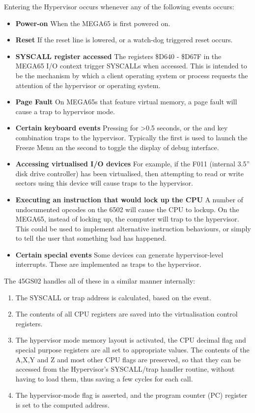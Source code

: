 Entering the Hypervisor occurs whenever any of the following events occurs:

\begin{itemize}
\item{\bf Power-on} When the MEGA65 is first powered on.
\item{\bf Reset} If the reset line is lowered, or a watch-dog triggered reset occurs.
\item{\bf SYSCALL register accessed} The registers \$D640 - \$D67F in the MEGA65 I/O context trigger SYSCALLs when accessed.
  This is intended to be the mechanism by which a client operating system or process requests the attention of the hypervisor or operating system.
\item{\bf Page Fault} On MEGA65s that feature virtual memory, a page fault will cause a trap to hypervisor mode.
\item{\bf Certain keyboard events} Pressing  for >0.5 seconds, or the  and
 key combination traps to the hypervisor.  Typically the first is used to launch the Freeze Menu an the second to toggle the display of debug interface.
\item{\bf Accessing virtualised I/O devices} For example, if the F011 (internal 3.5'' disk drive controller) has been virtualised, then attempting to read or write sectors using this device will cause traps to the hypervisor.
  \item{\bf Executing an instruction that would lock up the CPU} A number of undocumented opcodes on the 6502 will cause the CPU to lockup.  On the MEGA65, instead of locking up, the computer will trap to the hypervisor.  This could be used to implement alternative instruction behaviours, or simply to tell the user that something bad has happened.
  \item{\bf Certain special events} Some devices can generate hypervisor-level interrupts. These are implemented as traps to the hypervisor.
\end{itemize}

The 45GS02 handles all of these in a similar manner internally:

\begin{enumerate}
\item The SYSCALL or trap address is calculated, based on the event.
\item The contents of all CPU registers are saved into the virtualisation control registers.
\item The hypervisor mode memory layout is activated, the CPU decimal flag and special purpose registers are all set to appropriate values.  The contents of the A,X,Y and Z and most other CPU flags are preserved, so that they can be accessed from the Hypervisor's SYSCALL/trap handler routine, without having to load them, thus saving a few cycles for each call.
\item The hypervisor-mode flag is asserted, and the program counter (PC) register is set to the computed address.
\end{enumerate}

